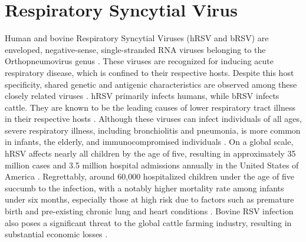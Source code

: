 \section{Respiratory Syncytial Virus} \label{sec:Respiratory Syncytial Virus}
Human and bovine Respiratory Syncytial Viruses (hRSV and bRSV) are enveloped, negative-sense, single-stranded RNA viruses belonging to the Orthopneumovirus genus \cite{Afonso2016Taxonomy2016}. These viruses are recognized for inducing acute respiratory disease, which is confined to their respective hosts. Despite this host specificity, shared genetic and antigenic characteristics are observed among these closely related viruses \cite{Buchholz2000ChimericVaccine}. hRSV primarily infects humans, while bRSV infects cattle. They are known to be the leading causes of lower respiratory tract illness in their respective hosts \cite{Nair2013GlobalAnalysis, Sacco2014RespiratoryCattle}. Although these viruses can infect individuals of all ages, severe respiratory illness, including bronchiolitis and pneumonia, is more common in infants, the elderly, and immunocompromised individuals \cite{Falsey2005RespiratoryAdults, Coultas2019RespiratoryAge}. On a global scale, hRSV affects nearly all children by the age of five, resulting in approximately 35 million cases and 3.5 million hospital admissions annually in the United States of America \cite{Shi2017GlobalStudy}. Regrettably, around 60,000 hospitalized children under the age of five succumb to the infection, with a notably higher mortality rate among infants under six months, especially those at high risk due to factors such as premature birth and pre-existing chronic lung and heart conditions \cite{Shi2017GlobalStudy, Jha2016RespiratoryVirus, Coultas2019RespiratoryAge}. Bovine RSV infection also poses a significant threat to the global cattle farming industry, resulting in substantial economic losses \cite{Brodersen2010BovineVirus, Valarcher2007BovineInfection}.

